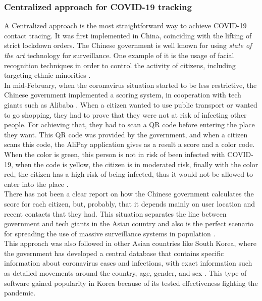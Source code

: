 \documentclass[a4paper, 12pt]{article}
\begin{document}
\subsubsection{Centralized approach for COVID-19 tracking}
\label{subsubsection:centralized-approach}

A Centralized approach is the most straightforward way to achieve COVID-19 contact tracing. It was first implemented in China, coinciding with the lifting of strict lockdown orders. The Chinese government is well known for using \textit{state of the art} technology for surveillance. One example of it is the usage of facial recognition techniques in order to control the activity of citizens, including targeting ethnic minorities \cite{china-massive-covid-tracking}. \\

In mid-February, when the coronavirus situation started to be less restrictive, the Chinese government implemented a scoring system, in cooperation with tech giants such as Alibaba \cite{china-massive-covid-tracking}. When a citizen wanted to use public transport or wanted to go shopping, they had to prove that they were not at risk of infecting other people. For achieving that, they had to scan a QR code before entering the place they want. This QR code was provided by the government, and when a citizen scans this code, the AliPay application gives as a result a score and a color code. When the color is green, this person is not in risk of been infected with COVID-19, when the code is yellow, the citizen is in moderated risk, finally with the color red, the citizen has a high risk of being infected, thus it would not be allowed to enter into the place \cite{china-qr-codes}. \\

There has not been a clear report on how the Chinese government calculates the score for each citizen, but, probably, that it depends mainly on user location and recent contacts that they had. This situation separates the line between government and tech giants in the Asian country and also is the perfect scenario for spreading the use of massive surveillance systems in population \cite{china-qr-codes}. \\

This approach was also followed in other Asian countries like South Korea, where the government has developed a central database that contains specific information about coronavirus cases and infections, with exact information such as detailed movements around the country, age, gender, and sex \cite{south-korea-surveillance}. This type of software gained popularity in Korea because of its tested effectiveness fighting the pandemic. \\
\end{document}
